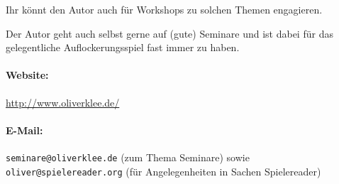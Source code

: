 Ihr könnt den Autor auch für Workshops zu solchen Themen engagieren.

Der Autor geht auch selbst gerne auf (gute) Seminare und ist dabei für das gelegentliche Auflockerungsspiel fast immer zu haben.

\paragraph{Website:} \url{http://www.oliverklee.de/}
\paragraph{E-Mail:} \texttt{seminare@oliverklee.de} (zum Thema Seminare) sowie \texttt{oliver@spielereader.org} (für Angelegenheiten in Sachen Spielereader)
